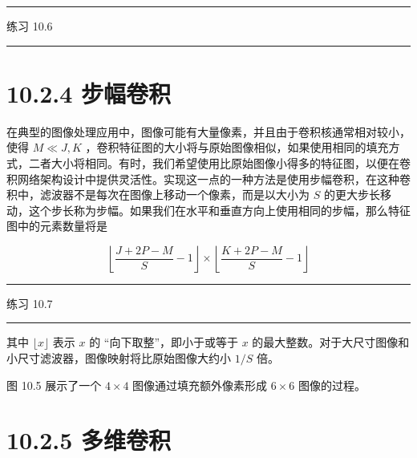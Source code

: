 \documentclass[10pt]{report}
\newcommand{\HRule}{\begin{center}\rule{0.9\linewidth}{0.2mm}\end{center}}
\begin{document}
\HRule

练习 10.6

\HRule

\section*{10.2.4 步幅卷积}

在典型的图像处理应用中，图像可能有大量像素，并且由于卷积核通常相对较小，使得 \(M \ll  J,K\) ，卷积特征图的大小将与原始图像相似，如果使用相同的填充方式，二者大小将相同。有时，我们希望使用比原始图像小得多的特征图，以便在卷积网络架构设计中提供灵活性。实现这一点的一种方法是使用步幅卷积，在这种卷积中，滤波器不是每次在图像上移动一个像素，而是以大小为 \(S\) 的更大步长移动，这个步长称为步幅。如果我们在水平和垂直方向上使用相同的步幅，那么特征图中的元素数量将是

\[
\left\lfloor  {\frac{J + {2P} - M}{S} - 1}\right\rfloor   \times  \left\lfloor  {\frac{K + {2P} - M}{S} - 1}\right\rfloor   \tag{10.5}
\]

\HRule

练习 10.7

\HRule

其中 \(\lfloor x\rfloor\) 表示 \(x\) 的 “向下取整”，即小于或等于 \(x\) 的最大整数。对于大尺寸图像和小尺寸滤波器，图像映射将比原始图像大约小 \(1/S\) 倍。

图 10.5 展示了一个 \(4 \times  4\) 图像通过填充额外像素形成 \(6 \times  6\) 图像的过程。

\begin{center}
\end{center}

\section*{10.2.5 多维卷积}
\end{document}
